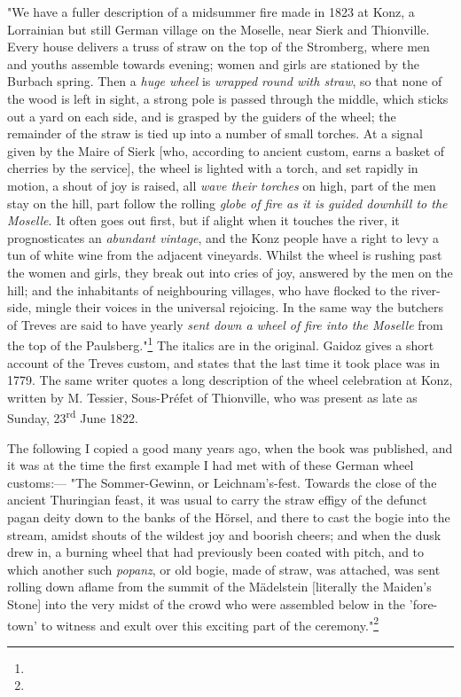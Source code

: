 \documentclass[a4paper, 11pt, oneside, polutonikogreek, english]{article}
\begin{document}
"We have a fuller description of a midsummer fire made in 1823 at Konz, a Lorrainian but still German village on the Moselle, near Sierk and Thionville. Every house delivers a truss of straw on the top of the Stromberg, where men and youths assemble towards evening; women and girls are stationed by the Burbach spring. Then a \emph{huge wheel} is \emph{wrapped round with straw}, so that none of the wood is left in sight, a strong pole is passed through the middle, which sticks out a yard on each side, and is grasped by the guiders of the wheel; the remainder of the straw is tied up into a number of small torches. At a signal given by the Maire of Sierk [who, according to ancient custom, earns a basket of cherries by the service], the wheel is lighted with a torch, and set rapidly in motion, a shout of joy is raised, all \emph{wave their torches} on high, part of the men stay on the hill, part follow the rolling \emph{globe of fire as it is guided downhill to the Moselle}. It often goes out first, but if alight when it touches the river, it prognosticates an \emph{abundant vintage}, and the Konz people have a right to levy a tun of white wine from the adjacent vineyards. Whilst the wheel is rushing past the women and girls, they break out into cries of joy, answered by the men on the hill; and the inhabitants of neighbouring villages, who have flocked to the river-side, mingle their voices in the universal rejoicing. In the same way the butchers of Treves are said to have yearly \emph{sent down a wheel of fire into the Moselle} from the top of the Paulsberg."\footnote{} The italics are in the original. Gaidoz gives a short account of the Treves custom, and states that the last time it took place was in 1779. The same writer quotes a long description of the wheel celebration at Konz, written by M. Tessier, Sous-Préfet of Thionville, who was present as late as Sunday, 23\textsuperscript{rd} June 1822.

The following I copied a good many years ago, when the book was published, and it was at the time the first example I had met with of these German wheel customs:--- "The Sommer-Gewinn, or Leichnam's-fest. Towards the close of the ancient Thuringian feast, it was usual to carry the straw effigy of the defunct pagan deity down to the banks of the Hörsel, and there to cast the bogie into the stream, amidst shouts of the wildest joy and boorish cheers; and when the dusk drew in, a burning wheel that had previously been coated with pitch, and to which another such \emph{popanz}, or old bogie, made of straw, was attached, was sent rolling down aflame from the summit of the Mädelstein [literally the Maiden's Stone] into the very midst of the crowd who were assembled below in the 'fore-town' to witness and exult over this exciting part of the ceremony."\footnote{}
\end{document}
